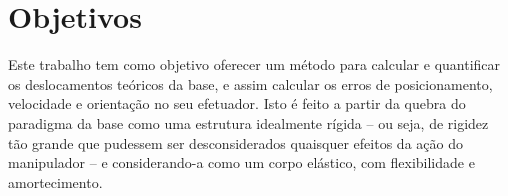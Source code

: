 % 
% 
% 



\section{Objetivos}

Este trabalho tem como objetivo oferecer um método para calcular e quantificar
os deslocamentos teóricos da base, e assim calcular os erros de posicionamento,
velocidade e orientação no seu efetuador. Isto é feito a partir da
quebra do paradigma da base como uma estrutura idealmente rígida -- ou seja, de
rigidez tão grande que pudessem ser desconsiderados quaisquer efeitos da ação do
manipulador -- e considerando-a como um corpo elástico, com flexibilidade e
amortecimento.

